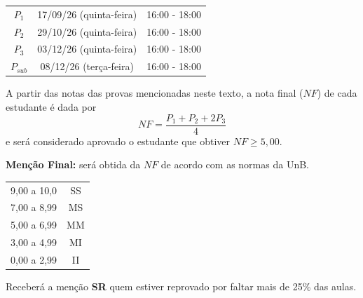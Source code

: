 \documentclass[12pt]{exam}
\begin{document}
\begin{center}
    \begin{tabular}{c|c|c}
        \hline\hline
        \hspace{1cm}{\bf Prova}\hspace{1cm} & \hspace{3cm}{\bf Data}\hspace{3cm}  & \hspace{1.7cm}{\bf Horário}\hspace{1.7cm} \\
        \hline\hline
        $P_1$                               & 17/09/26 (quinta-feira) \phantom{x} & 16:00 - 18:00                             \\
        \hline
        $P_2$                               & 29/10/26 (quinta-feira) \phantom{x} & 16:00 - 18:00                             \\
        \hline
        $P_3$                               & 03/12/26 (quinta-feira) \phantom{x} & 16:00 - 18:00                             \\
        \hline
        $P_{sub}$                           & 08/12/26 (terça-feira) \phantom{x}  & 16:00 - 18:00                             \\
        \hline\hline
    \end{tabular}
\end{center}

 A partir das notas das provas mencionadas neste texto, a nota final ($NF$) de cada estudante é dada
por
\vspace{-0.15cm}
\[
    NF = \frac{ P_1 + P_2 + 2P_3}{4}
\]
e será considerado aprovado o estudante que obtiver $NF \geq 5,00$.

    {\bf \noindent Menção Final:} será obtida da $NF$ de
acordo com as normas da UnB.
\begin{center}
    \begin{tabular}{c|c}
        \hline\hline
        \hspace{1cm}{Nota}\hspace{1cm} & \hspace{0.25cm}{Menção}\hspace{0.25cm} \\
        \hline\hline
        9,00 a 10,0                    & SS                                     \\
        \hline
        7,00 a 8,99                    & MS                                     \\
        \hline
        5,00 a 6,99                    & MM                                     \\
        \hline
        3,00 a 4,99                    & MI                                     \\
        \hline
        0,00 a 2,99                    & II                                     \\
        \hline\hline
    \end{tabular}
\end{center}
Receberá a menção {\bf SR} quem estiver reprovado por faltar mais de 25\%
das aulas.
\end{document}
